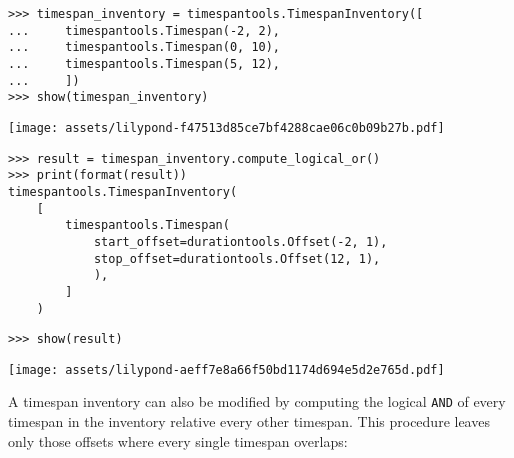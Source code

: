 \begin{comment}
<abjad>
timespan_inventory = timespantools.TimespanInventory([
    timespantools.Timespan(-2, 2),
    timespantools.Timespan(0, 10),
    timespantools.Timespan(5, 12),
    ])
show(timespan_inventory)
result = timespan_inventory.compute_logical_or()
print(format(result))
show(result)
</abjad>
\end{comment}

\begin{abjadbookoutput}
\begin{singlespacing}
\vspace{-0.5\baselineskip}
\begin{verbatim}
>>> timespan_inventory = timespantools.TimespanInventory([
...     timespantools.Timespan(-2, 2),
...     timespantools.Timespan(0, 10),
...     timespantools.Timespan(5, 12),
...     ])
>>> show(timespan_inventory)
\end{verbatim}
\noindent\texttt{[image: assets/lilypond-f47513d85ce7bf4288cae06c0b09b27b.pdf]}
\begin{verbatim}
>>> result = timespan_inventory.compute_logical_or()
>>> print(format(result))
timespantools.TimespanInventory(
    [
        timespantools.Timespan(
            start_offset=durationtools.Offset(-2, 1),
            stop_offset=durationtools.Offset(12, 1),
            ),
        ]
    )
\end{verbatim}
\begin{verbatim}
>>> show(result)
\end{verbatim}
\noindent\texttt{[image: assets/lilypond-aeff7e8a66f50bd1174d694e5d2e765d.pdf]}
\end{singlespacing}
\end{abjadbookoutput}

\noindent A timespan inventory can also be modified by computing the logical
\texttt{AND} of every timespan in the inventory relative every other timespan.
This procedure leaves only those offsets where every single timespan
overlaps:

\begin{comment}
<abjad>
timespan_inventory = timespantools.TimespanInventory([
    timespantools.Timespan(-2, 8),
    timespantools.Timespan(0, 10),
    timespantools.Timespan(5, 12),
    ])
show(timespan_inventory)
result = timespan_inventory.compute_logical_and()
print(format(result))
show(result, range_=(-2, 12))
</abjad>
\end{comment}

